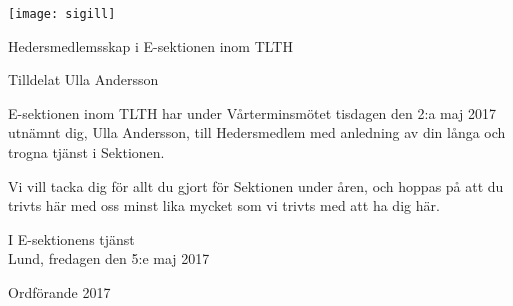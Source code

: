 \documentclass[12pt]{article}
\def\erik{Erik Månsson}
\def\ulla{Ulla Andersson}
\def\docauthor{\erik}
\begin{document}
    \vspace*{2mm}

    \begin{center}
        \texttt{[image: sigill]}\par
        \vspace*{6mm}
        {\Large Hedersmedlemsskap i E-sektionen inom TLTH}\par
        \vspace*{1mm}
        {\Large Tilldelat {\ulla}}\par
    \end{center}

    \vspace*{4mm}

    E-sektionen inom TLTH har under Vårterminsmötet tisdagen den 2:a maj 2017 utnämnt dig, {\ulla}, till Hedersmedlem med anledning av din långa och trogna tjänst i Sektionen.

    Vi vill tacka dig för allt du gjort för Sektionen under åren, och hoppas på att du trivts här med oss minst lika mycket som vi trivts med att ha dig här.

    \begin{signatures}{1}
        I E-sektionens tjänst \\
        Lund, fredagen den 5:e maj 2017
        \signature{\docauthor}{Ordförande 2017}
    \end{signatures}
\end{document}
